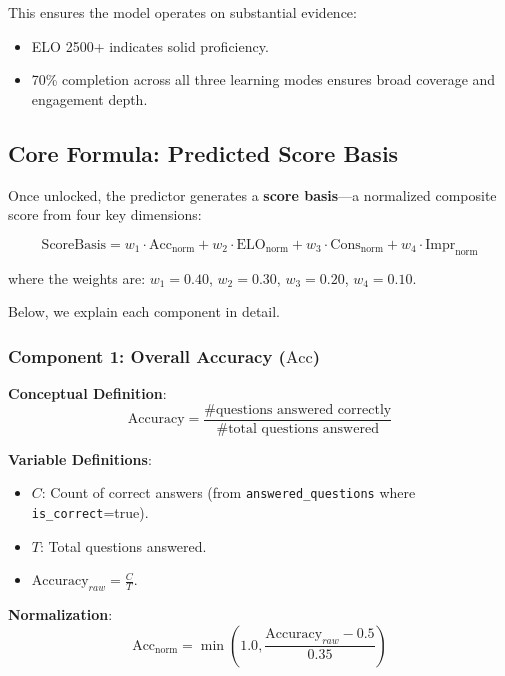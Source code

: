 \documentclass[sigconf,authordraft,twoside]{acmart}
\newcommand{\tech}[1]{\textcolor{brandblue}{\nolinkurl{#1}}}
\begin{document}
This ensures the model operates on substantial evidence:
\begin{itemize}
\item ELO 2500+ indicates solid proficiency.
\item 70\% completion across all three learning modes ensures broad coverage and engagement depth.
\end{itemize}

\subsection{Core Formula: Predicted Score Basis}

Once unlocked, the predictor generates a \textbf{score basis}---a normalized composite score from four key dimensions:

\begin{equation}
\text{ScoreBasis} = w_1 \cdot \text{Acc}_{\text{norm}} + w_2 \cdot \text{ELO}_{\text{norm}} + w_3 \cdot \text{Cons}_{\text{norm}} + w_4 \cdot \text{Impr}_{\text{norm}}
\end{equation}

where the weights are: $w_1 = 0.40$, $w_2 = 0.30$, $w_3 = 0.20$, $w_4 = 0.10$.

Below, we explain each component in detail.

\subsubsection{Component 1: Overall Accuracy ($\text{Acc}$)}

\textbf{Conceptual Definition}:
\begin{equation}
\text{Accuracy} = \frac{\text{\# questions answered correctly}}{\text{\# total questions answered}}
\end{equation}

\textbf{Variable Definitions}:
\begin{itemize}
\item $C$: Count of correct answers (from \tech{answered\_questions} where \tech{is\_correct}=true).
\item $T$: Total questions answered.
\item $\text{Accuracy}_{raw} = \frac{C}{T}$.
\end{itemize}

\textbf{Normalization}:
\begin{equation}
\text{Acc}_{\text{norm}} = \min\left(1.0, \frac{\text{Accuracy}_{raw} - 0.5}{0.35}\right)
\end{equation}
\end{document}
